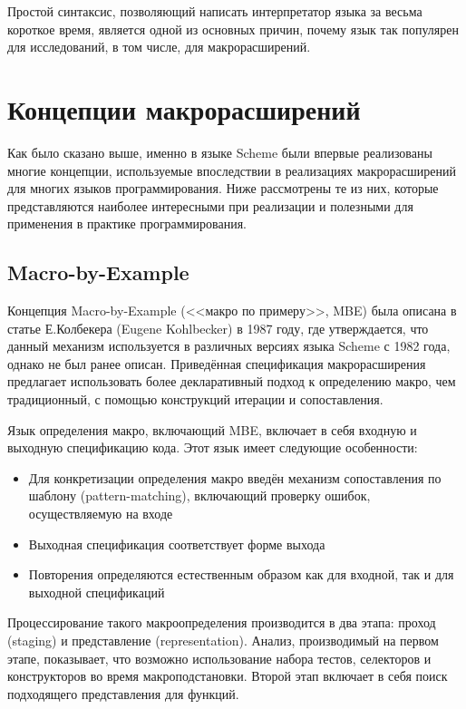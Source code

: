 Простой синтаксис, позволяющий написать интерпретатор языка за весьма короткое время, является одной из основных причин, почему язык так популярен для исследований, в том числе, для макрорасширений.

\newpage
\section{Концепции макрорасширений}

Как было сказано выше, именно в языке Scheme были впервые реализованы многие концепции, используемые впоследствии в реализациях макрорасширений для многих языков программирования. Ниже рассмотрены те из них, которые представляются наиболее интересными при реализации и полезными для применения в практике программирования.

\subsection{Macro-by-Example}

Концепция Macro-by-Example (<<макро по примеру>>, MBE) была описана в статье Е.Колбекера (Eugene Kohlbecker) в 1987 году\cite{Kohlbecker:1987:MDS:41625.41632}, где утверждается, что данный механизм используется в различных версиях языка Scheme с 1982 года, однако не был ранее описан. Приведённая спецификация макрорасширения предлагает использовать более декларативный подход к определению макро, чем традиционный, с помощью конструкций итерации и сопоставления.

Язык определения макро, включающий MBE, включает в себя входную и выходную спецификацию кода. Этот язык имеет следующие особенности:

\begin{itemize}
\item Для конкретизации определения макро введён механизм сопоставления по шаблону (pattern-matching), включающий проверку ошибок, осуществляемую на входе
\item Выходная спецификация соответствует форме выхода
\item Повторения определяются естественным образом как для входной, так и для выходной спецификаций
\end{itemize}

Процессирование такого макроопределения производится в два этапа: проход (staging) и представление (representation). Анализ, производимый на первом этапе, показывает, что возможно использование набора тестов, селекторов и конструкторов во время макроподстановки. Второй этап включает в себя поиск подходящего представления для функций.


